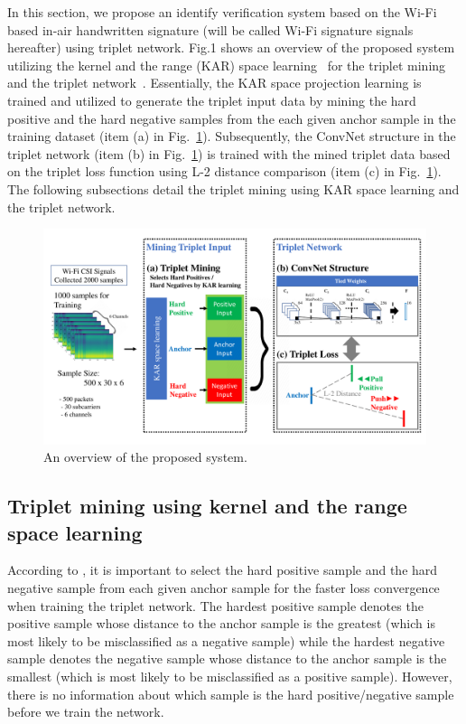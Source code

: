 \documentclass[runningheads]{llncs}
\begin{document}
In this section, we propose an identify verification system based on the Wi-Fi based in-air handwritten signature (will be called Wi-Fi signature signals hereafter) using triplet network. Fig.1 shows an overview of the proposed system utilizing the kernel and the range (KAR) space learning~\cite{toh2018learning,toh2018gradient} for the triplet mining and the triplet network~\cite{schroff2015facenet}.
Essentially, the KAR space projection learning is trained and utilized to generate the triplet input data by mining the hard positive and the hard negative samples from the each given anchor sample in the training dataset (item (a) in Fig.~\ref{fig1}).
Subsequently, the ConvNet structure in the triplet network (item (b) in Fig.~\ref{fig1}) is trained with the mined triplet data based on the triplet loss function using L-2 distance comparison (item (c) in Fig.~\ref{fig1}).
The following subsections detail the triplet mining using KAR space learning and the triplet network.

\begin{figure}[!ht]
    \includegraphics[width=\textwidth]{fig1_tcnn_kar_v5}
    \caption{An overview of the proposed system.} \label{fig1}
\end{figure}

\subsection{Triplet mining using kernel and the range space learning}
According to \cite{schroff2015facenet}, it is important to select the hard positive sample and the hard negative sample from each given anchor sample for the faster loss convergence when training the triplet network.
The hardest positive sample denotes the positive sample whose distance to the anchor sample is the greatest (which is most likely to be misclassified as a negative sample) while the hardest negative sample denotes the negative sample whose distance to the anchor sample is the smallest (which is most likely to be misclassified as a positive sample). However, there is no information about which sample is the hard positive/negative sample before we train the network.
\end{document}
